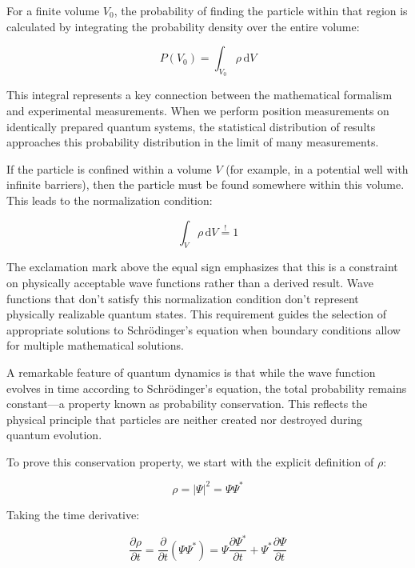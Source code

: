 For a finite volume $V_{0}$, the probability of finding the particle within that region is calculated by integrating the probability density over the entire volume:

\begin{equation}
P\left(V_{0}\right)=\int_{V_{0}} \rho \, \mathrm{d} V
\end{equation}

This integral represents a key connection between the mathematical formalism and experimental measurements. When we perform position measurements on identically prepared quantum systems, the statistical distribution of results approaches this probability distribution in the limit of many measurements.

If the particle is confined within a volume $V$ (for example, in a potential well with infinite barriers), then the particle must be found somewhere within this volume. This leads to the normalization condition:

\begin{equation}
\int_{V} \rho \, \mathrm{d} V \stackrel{!}{=} 1
\end{equation}

The exclamation mark above the equal sign emphasizes that this is a constraint on physically acceptable wave functions rather than a derived result. Wave functions that don't satisfy this normalization condition don't represent physically realizable quantum states. This requirement guides the selection of appropriate solutions to Schrödinger's equation when boundary conditions allow for multiple mathematical solutions.

A remarkable feature of quantum dynamics is that while the wave function evolves in time according to Schrödinger's equation, the total probability remains constant—a property known as probability conservation. This reflects the physical principle that particles are neither created nor destroyed during quantum evolution.

To prove this conservation property, we start with the explicit definition of $\rho$:

\begin{equation}
\rho=|\Psi|^{2}=\Psi \Psi^{*}
\end{equation}

Taking the time derivative:

\begin{equation}
\frac{\partial \rho}{\partial t}=\frac{\partial}{\partial t}(\Psi \Psi^{*})=\Psi \frac{\partial \Psi^{*}}{\partial t}+\Psi^{*} \frac{\partial \Psi}{\partial t} \label{eq:1.28}
\end{equation}

